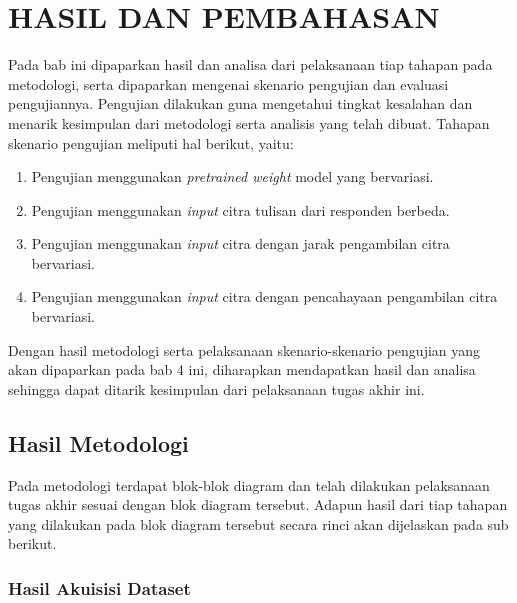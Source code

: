 \chapter{HASIL DAN PEMBAHASAN}
\label{chap:hasilpembahasan}


Pada bab ini dipaparkan hasil dan analisa dari pelaksanaan tiap tahapan pada metodologi, serta dipaparkan mengenai skenario pengujian dan evaluasi pengujiannya. Pengujian dilakukan guna mengetahui tingkat kesalahan dan menarik kesimpulan dari metodologi serta analisis yang telah dibuat. Tahapan skenario pengujian meliputi hal berikut, yaitu: \par

\begin{enumerate}[nolistsep]
  \item Pengujian menggunakan \textit{pretrained weight} model yang bervariasi.
  \item Pengujian menggunakan \textit{input} citra tulisan dari responden berbeda.
  \item Pengujian menggunakan \textit{input} citra dengan jarak pengambilan citra bervariasi.
  \item Pengujian menggunakan \textit{input} citra dengan pencahayaan pengambilan citra bervariasi.
\end{enumerate}

Dengan hasil metodologi serta pelaksanaan skenario-skenario pengujian yang akan dipaparkan pada bab 4 ini, diharapkan mendapatkan hasil dan analisa sehingga dapat ditarik kesimpulan dari pelaksanaan tugas akhir ini. \par

\section{Hasil Metodologi}
\label{sec:hasilmetodologi}

Pada metodologi terdapat blok-blok diagram dan telah dilakukan pelaksanaan tugas akhir sesuai dengan blok diagram tersebut. Adapun hasil dari tiap tahapan yang dilakukan pada blok diagram tersebut secara rinci akan dijelaskan pada sub berikut. \par

\subsection{Hasil Akuisisi Dataset}
\label{subsec:Hasilakuisisidataset}

